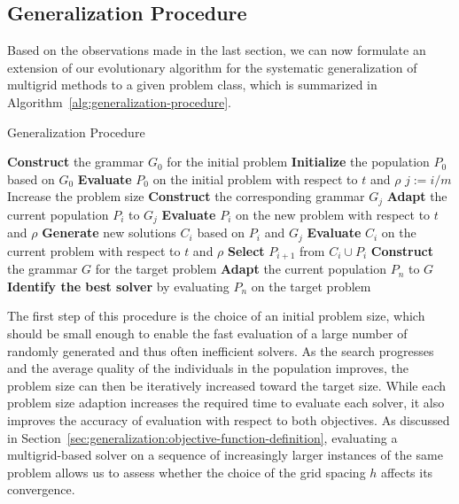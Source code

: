 \subsection{Generalization Procedure}
\label{sec:generalization-procedure}
Based on the observations made in the last section, we can now formulate an extension of our evolutionary algorithm for the systematic generalization of multigrid methods to a given problem class, which is summarized in Algorithm~\ref{alg:generalization-procedure}.
\begin{algorithm}
	\caption{Generalization Procedure}
	\label{alg:generalization-procedure}
	\begin{algorithmic} %
		\State \textbf{Construct} the grammar $G_0$ for the initial problem
		\State \textbf{Initialize} the population $P_0$ based on $G_0$
		\State \textbf{Evaluate} $P_0$ on the initial problem with respect to $t$ and $\rho$
		\State $j := i / m$ 
		\State Increase the problem size
		\State \textbf{Construct} the corresponding grammar $G_j$
		\State  \textbf{Adapt} the current population $P_i$ to $G_j$
		\State \textbf{Evaluate} $P_i$ on the new problem with respect to $t$ and $\rho$
		\EndIf
		\State \textbf{Generate} new solutions $C_i$ based on $P_i$ and $G_j$
		\State \textbf{Evaluate} $C_i$ on the current problem with respect to $t$ and $\rho$
		\State \textbf{Select} $P_{i+1}$ from $C_i \cup P_i$
		\EndFor
		\State \textbf{Construct} the grammar $G$ for the target problem
		\State  \textbf{Adapt} the current population $P_n$ to $G$
		\State \textbf{Identify the best solver} by evaluating $P_{n}$ on the target problem
	\end{algorithmic}
\end{algorithm}
The first step of this procedure is the choice of an initial problem size, which should be small enough to enable the fast evaluation of a large number of randomly generated and thus often inefficient solvers.
As the search progresses and the average quality of the individuals in the population improves, the problem size can then be iteratively increased toward the target size.
While each problem size adaption increases the required time to evaluate each solver, it also improves the accuracy of evaluation with respect to both objectives.
As discussed in Section~\ref{sec:generalization:objective-function-definition}, evaluating a multigrid-based solver on a sequence of increasingly larger instances of the same problem allows us to assess whether the choice of the grid spacing $h$ affects its convergence.
